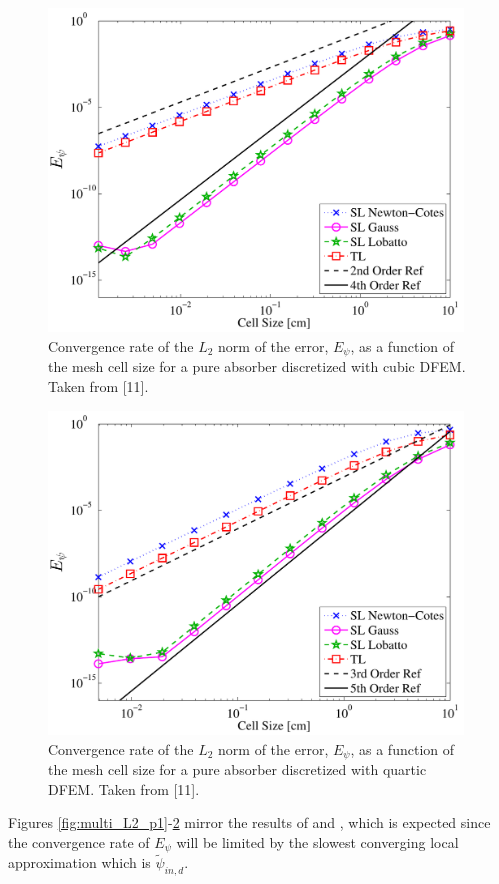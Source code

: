 \begin{figure}[!hbp]
\centering
\includegraphics[width=11cm]{chapter2_constant_xs/Cubic_L2_err-eps-converted-to.pdf}
\caption{Convergence rate of the $L_2$ norm of the error, $E_{\psi}$,  as a function of the mesh cell size for a pure absorber discretized with cubic DFEM.  Taken from [11].}
\label{fig:multi_L2_p3}
\end{figure}
\begin{figure}[!htp]
\centering
\includegraphics[width=11cm]{chapter2_constant_xs/Quartic_L2_err-eps-converted-to.pdf}
\caption{Convergence rate of the $L_2$ norm of the error, $E_{\psi}$,  as a function of the mesh cell size for a pure absorber discretized with quartic DFEM.  Taken from [11].}
\label{fig:multi_L2_p4}
\end{figure}
Figures \ref{fig:multi_L2_p1}-\ref{fig:multi_L2_p4} mirror the results of  and , which is expected since the convergence rate of $E_{\psi}$ will be limited by the slowest converging local approximation which is $\widetilde{\psi}_{in,d}$.  
